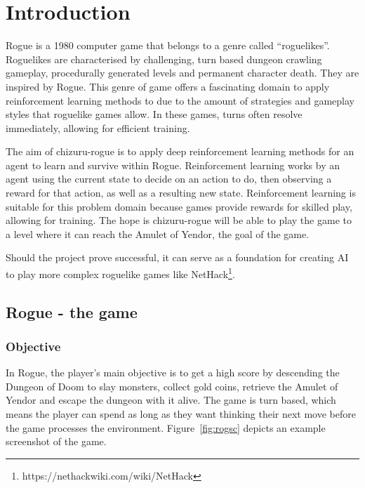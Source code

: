 \documentclass[12pt,a4paper]{article}
\begin{document}
    \newpage

    \tableofcontents
    \listoffigures

    \newpage


    \section{Introduction}\label{sec:introduction}
    Rogue is a 1980 computer game that belongs to a genre called ``roguelikes''.
    Roguelikes are characterised by challenging, turn based dungeon crawling gameplay, procedurally generated levels and permanent character death.
    They are inspired by Rogue.
    This genre of game offers a fascinating domain to apply reinforcement learning methods to due to the amount of strategies and gameplay styles that roguelike games allow.
    In these games, turns often resolve immediately, allowing for efficient training.

    The aim of chizuru-rogue is to apply deep reinforcement learning methods for an agent to learn and survive within Rogue.
    Reinforcement learning works by an agent using the current state to decide on an action to do, then observing a reward for that action, as well as a resulting new state.
    Reinforcement learning is suitable for this problem domain because games provide rewards for skilled play, allowing for training.
    The hope is chizuru-rogue will be able to play the game to a level where it can reach the Amulet of Yendor, the goal of the game.

    Should the project prove successful, it can serve as a foundation for creating AI to play more complex
    roguelike games like NetHack\footnote{https://nethackwiki.com/wiki/NetHack}.

    \subsection{Rogue - the game}\label{subsec:rogue}
    \subsubsection{Objective}\label{subsubsec:objective}
    In Rogue, the player's main objective is to get a high score by descending the Dungeon of Doom to slay monsters, collect gold coins, retrieve the Amulet of Yendor and escape the dungeon with it alive.
    The game is turn based, which means the player can spend as long as they want thinking their next move before the game processes the environment.
    Figure~\ref{fig:rogsc} depicts an example screenshot of the game.
\end{document}
